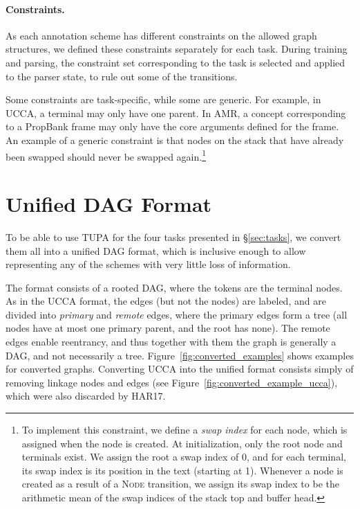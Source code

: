 \documentclass[11pt,a4paper]{article}
\begin{document}
\paragraph{Constraints.}
As each annotation scheme has different constraints on the allowed graph structures,
we defined these constraints separately for each task.
During training and parsing, the constraint set corresponding to the task is
selected and applied to the parser state, to rule out some of the transitions.

Some constraints are task-specific, while some are generic.
For example, in UCCA, a terminal may only have one parent.
In AMR, a concept corresponding to a PropBank frame may only have 
the core arguments defined for the frame.
An example of a generic constraint is that nodes on the stack 
that have already been swapped
should never be swapped again.\footnote{
	To implement this constraint, we define a \textit{swap index}
	for each node, which is assigned when the node is created.
	At initialization, only the root node and terminals exist.
	We assign the root a swap index of 0, and for each terminal, its swap index
	is its position in the text (starting at 1).
	Whenever a node is created as a result of a \textsc{Node}
	transition, we assign its swap index to be the arithmetic 
	mean of the swap indices of the stack top and buffer head.}


\section{Unified DAG Format}\label{sec:conversion}

To be able to use TUPA for the four tasks presented in \S\ref{sec:tasks},
we convert them all into a unified DAG format, which is inclusive enough to
allow representing any of the schemes with very little loss of information.

The format consists of a rooted DAG, where the tokens are the terminal nodes.
As in the UCCA format, the edges (but not the nodes) are labeled,
and are divided into \textit{primary} and \textit{remote} edges,
where the primary edges form a tree (all nodes have at most one primary parent,
and the root has none).
The remote edges enable reentrancy, and thus together with them the graph
is generally a DAG, and not necessarily a tree.
Figure~\ref{fig:converted_examples} shows examples for converted graphs.
Converting UCCA into the unified format consists simply of removing linkage 
nodes and edges (see Figure~\ref{fig:converted_example_ucca}), which were
also discarded by HAR17.
\end{document}
